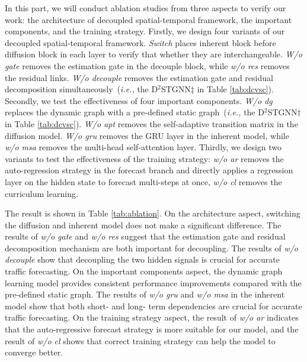 \documentclass[sigconf, nonacm]{acmart}
\newcommand{\ie}{\textit{i.e.,}\xspace}
\begin{document}
{\begin{table*}[ht]
\begin{tabular}{cccr|ccr|ccr}
\hline
\bottomrule
\end{tabular}
\end{table*}
} {\color{black}In this part, we will conduct ablation studies from three aspects to verify our work: the architecture of decoupled spatial-temporal framework, the important components, and the training strategy.
Firstly, we design four variants of our decoupled spatial-temporal framework.
\textit{Switch} places inherent block before diffusion block in each layer to verify that whether they are interchangeable. 
\textit{W/o gate} removes the estimation gate in the decouple block, while \textit{w/o res} removes the residual links.
\textit{W/o decouple} removes the estimation gate and residual decomposition simultaneously~(\ie the D$^2$STGNN$\ddagger$ in Table \ref{tab:dcvsc}).
Secondly, we test the effectiveness of four important components.
\textit{W/o dg} replaces the dynamic graph with a pre-defined static graph~(\ie the D$^2$STGNN$\dagger$ in Table \ref{tab:dcvsc}).
\textit{W/o apt} removes the self-adaptive transition matrix in the diffusion model.
\textit{W/o gru} removes the GRU layer in the inherent model, while \textit{w/o msa} removes the multi-head self-attention layer.
Thirdly, we design two variants to test the effectiveness of the training strategy: \textit{w/o ar} removes the auto-regression strategy in the forecast branch and directly applies a regression layer on the hidden state to forecast multi-steps at once, \textit{w/o cl} removes the curriculum learning.

The result is shown in Table \ref{tab:ablation}.
On the architecture aspect, switching the diffusion and inherent model does not make a significant difference.
The results of \textit{w/o gate} and \textit{w/o res} suggest that the estimation gate and residual decomposition mechanism are both important for decoupling.
The results of \textit{w/o decouple} show that decoupling the two hidden signals is crucial for accurate traffic forecasting.
On the important components aspect, the dynamic graph learning model provides consistent performance improvements compared with the pre-defined static graph.
The results of \textit{w/o gru} and \textit{w/o msa} in the inherent model show that both short- and long- term dependencies are crucial for accurate traffic forecasting.
On the training strategy aspect, the result of \textit{w/o ar} indicates that the auto-regressive forecast strategy is more suitable for our model, and the result of \textit{w/o cl} shows that correct training strategy can help the model to converge better.}
\end{document}
